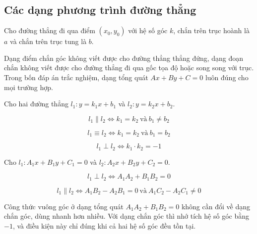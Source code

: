 \documentclass[11pt, a4paper]{article}
\begin{document}
\subsection{Các dạng phương trình đường thẳng}

\begin{dinhnghia}
Cho đường thẳng đi qua điểm $(x_0, y_0)$ với hệ số góc $k$, chắn trên trục hoành là $a$ và chắn trên trục tung là $b$.


 Dạng điểm chắn góc không viết được cho đường thẳng thẳng đứng, dạng đoạn chắn không viết được cho đường thẳng đi qua gốc tọa độ hoặc song song với trục. Trong bốn đáp án trắc nghiệm, dạng tổng quát $Ax + By + C = 0$ luôn đúng cho mọi trường hợp.
\end{dinhnghia}
\begin{dinhly}
Cho hai đường thẳng $l_1: y = k_1x + b_1$ và $l_2: y = k_2x + b_2$.

$$l_1 \parallel l_2 \iff k_1 = k_2 \ \text{và} \ b_1 \ne b_2$$

$$l_1 \equiv l_2 \iff k_1 = k_2 \ \text{và} \ b_1 = b_2$$

$$l_1 \perp l_2 \iff k_1 \cdot k_2 = -1$$
\end{dinhly}
\begin{dinhly}
Cho $l_1: A_1x + B_1y + C_1 = 0$ và $l_2: A_2x + B_2y + C_2 = 0$.

$$l_1 \perp l_2 \iff A_1A_2 + B_1B_2 = 0$$

$$l_1 \parallel l_2 \iff A_1B_2 - A_2B_1 = 0 \ \text{và} \ A_1C_2 - A_2C_1 \ne 0$$

 Công thức vuông góc ở dạng tổng quát $A_1A_2 + B_1B_2 = 0$ không cần đổi về dạng chắn góc, dùng nhanh hơn nhiều. Với dạng chắn góc thì nhớ tích hệ số góc bằng $-1$, và điều kiện này chỉ đúng khi cả hai hệ số góc đều tồn tại.
\end{dinhly}
\end{document}
